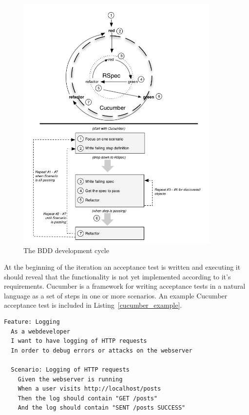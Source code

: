 \begin{figure}[htb]
  \centering
  \includegraphics[width=0.9\textwidth]{img/bdd_cycle.png}
  \caption{The BDD development cycle\cite{rspecbook}}
  \label{bdd_cycle}
\end{figure}

At the beginning of the iteration an acceptance test is written and executing
it should reveal that the functionality is not yet implemented according to
it's requirements. Cucumber is a framework for writing acceptance tests in a
natural language as a set of steps in one or more scenarios.  An example
Cucumber acceptance test is included in Listing~\ref{cucumber_example}.

\bigskip
\begin{lstlisting}[label=cucumber_example,caption=Cucumber acceptance test example]
Feature: Logging
  As a webdeveloper
  I want to have logging of HTTP requests
  In order to debug errors or attacks on the webserver

  Scenario: Logging of HTTP requests
    Given the webserver is running
    When a user visits http://localhost/posts
    Then the log should contain "GET /posts"
    And the log should contain "SENT /posts SUCCESS"
\end{lstlisting}

